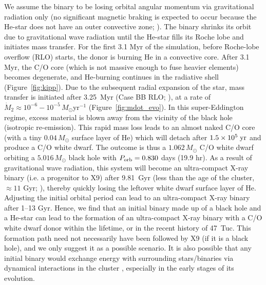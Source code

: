\documentclass[a4paper,fleqn,usenatbib]{mnras}
\begin{document}
We assume the binary to be losing orbital angular momentum via gravitational radiation only (no significant magnetic braking is expected to occur because the He-star does not have an outer convective zone; \citealp{2002ApJ...565.1107P}). The binary shrinks its orbit due to gravitational wave radiation until the He-star fills its Roche lobe and initiates mass transfer. For the first 3.1 Myr of the simulation, before Roche-lobe overflow (RLO) starts, the donor is burning He in a convective core. After 3.1 Myr, the C/O core (which is not massive enough to fuse heavier elements) becomes degenerate, and  He-burning continues in the radiative shell (Figure~\ref{fig:kipp}). Due to the subsequent radial expansion of the star, mass transfer is initiated after 3.25~Myr (Case BB RLO; \citealp{2015MNRAS.451.2123T}), at a rate of $\dot{M}_2 \approx 10^{-6}-10^{-5}\,M_\odot$yr$^{-1}$ (Figure~\ref{fig:mdot_evo}). In this super-Eddington regime, excess material is blown away from the vicinity of the black hole (isotropic re-emission). This rapid mass loss leads to an almost naked C/O core (with a tiny $0.04\,M_\odot$ surface layer of He) which will detach after $1.5\times 10^5\;{\rm yr}$ and produce a C/O white dwarf. The outcome is thus a $1.062\,M_\odot$ C/O white dwarf orbiting a $5.016\,M_\odot$ black hole with $P_{\rm orb}=0.830$ days (19.9 hr). As a result of gravitational wave radiation, this system will become an ultra-compact X-ray binary (i.e. a progenitor to X9) after 9.81~Gyr (less than the age of the cluster, $\approx 11$ Gyr; \citealp{2003A&A...408..529G}), thereby quickly losing the leftover white dwarf surface layer of He. Adjusting the initial orbital period can lead to an ultra-compact X-ray binary after 1--13 Gyr. Hence, we find that an initial binary made up of a black hole and a He-star can lead to the formation of an ultra-compact X-ray binary with a C/O white dwarf donor within the lifetime, or in the recent history of 47~Tuc. This formation path need not necessarily have been followed by X9 (if it is a black hole), and we only suggest it as a possible scenario. It is also possible that any initial binary would exchange energy with surrounding stars/binaries via dynamical interactions in the cluster \citep{2010ApJ...717..948I}, especially in the early stages of its evolution.
\end{document}
